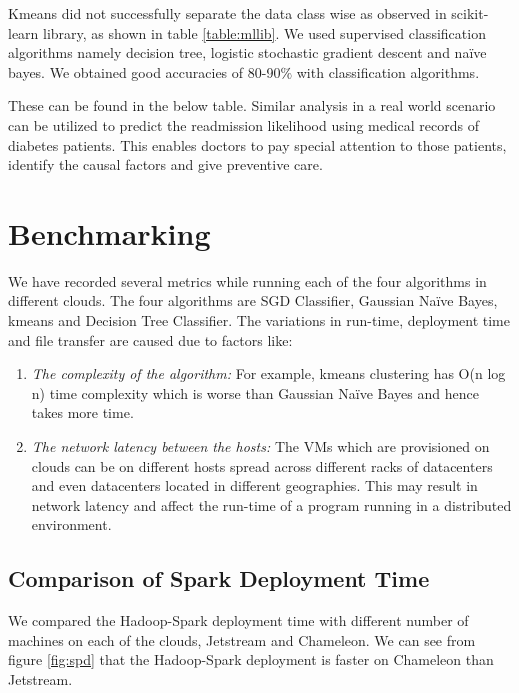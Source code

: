 \documentclass[9pt,twocolumn,twoside]{../../styles/osajnl}
\begin{document}
Kmeans did not successfully separate the data class wise as observed in scikit-learn library, as shown in table \ref{table:mllib}.  We used  supervised classification algorithms namely decision tree, logistic stochastic gradient descent and naïve bayes. We obtained good accuracies of 80-90$\%$ with classification algorithms.

These can be found in the below table.
Similar analysis in a real world scenario can be utilized to predict the readmission likelihood using medical records of diabetes patients. This enables doctors to  pay special attention to those patients, identify the causal factors and give preventive care.



\section{Benchmarking}

We have recorded several metrics while running each of the four algorithms in different clouds. The four algorithms are SGD Classifier, Gaussian Naïve Bayes, kmeans and Decision Tree Classifier.
The variations in run-time, deployment time and file transfer are caused due to factors like:

\begin{enumerate}
 \item \textit{The complexity of the algorithm:} For example,  kmeans clustering has  O(n log n) time complexity which is worse than Gaussian Naïve Bayes and hence takes more time.

 \item \textit{The network latency between the hosts:} The VMs which are provisioned on clouds can be on different hosts spread across different racks of datacenters and even datacenters located in different geographies. This may result in network latency and affect the run-time of a program running in a distributed environment.
\end{enumerate}

\subsection{Comparison of Spark Deployment Time}

We compared the Hadoop-Spark deployment time with different number of machines on each of the clouds, Jetstream and Chameleon. We can see from figure \ref{fig:spd} that the Hadoop-Spark deployment is faster on Chameleon than  Jetstream. 
\end{document}
